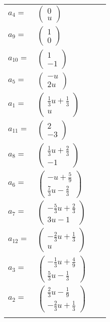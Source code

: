\documentclass[1p]{elsarticle_modified}
\theoremstyle{definition}
\begin{document}
\begin{tabular}{m{7pt} m{180pt} m{7pt} m{180pt} }
\flushright $a_{4}=$&$\begin{pmatrix}0\\u\end{pmatrix}$ \\
\flushright $a_{9}=$&$\begin{pmatrix}1\\0\end{pmatrix}$ \\
\flushright $a_{10}=$&$\begin{pmatrix}1\\-1\end{pmatrix}$ \\
\flushright $a_{5}=$&$\begin{pmatrix}- u\\2 u\end{pmatrix}$ \\
\flushright $a_{1}=$&$\begin{pmatrix}\frac{1}{3} u+\frac{1}{3}\\u\end{pmatrix}$ \\
\flushright $a_{11}=$&$\begin{pmatrix}2\\-3\end{pmatrix}$ \\
\flushright $a_{8}=$&$\begin{pmatrix}\frac{1}{3} u+\frac{2}{3}\\-1\end{pmatrix}$ \\
\flushright $a_{6}=$&$\begin{pmatrix}- u+\frac{5}{9}\\\frac{7}{3} u-\frac{2}{3}\end{pmatrix}$ \\
\flushright $a_{7}=$&$\begin{pmatrix}-\frac{5}{3} u+\frac{2}{3}\\3 u-1\end{pmatrix}$ \\
\flushright $a_{12}=$&$\begin{pmatrix}-\frac{2}{3} u+\frac{1}{3}\\u\end{pmatrix}$ \\
\flushright $a_{3}=$&$\begin{pmatrix}-\frac{1}{3} u+\frac{4}{9}\\\frac{5}{3} u-\frac{1}{3}\end{pmatrix}$ \\
\flushright $a_{2}=$&$\begin{pmatrix}\frac{2}{3} u-\frac{1}{9}\\-\frac{2}{3} u+\frac{1}{3}\end{pmatrix}$\\&\end{tabular}
\end{document}

